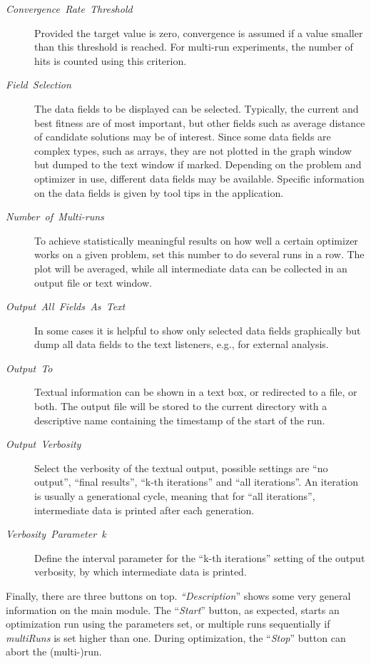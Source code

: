 \begin{description}
\item [{\textit{Convergence~Rate~Threshold}}] Provided the target value
is zero, convergence is assumed if a value smaller than this threshold
is reached. For multi-run experiments, the number of hits is counted
using this criterion.
\item [{\textit{Field~Selection}}] The data fields to be displayed can
be selected. Typically, the current and best fitness are of most important,
but other fields such as average distance of candidate solutions may
be of interest. Since some data fields are complex types, such as
arrays, they are not plotted in the graph window but dumped to the
text window if marked. Depending on the problem and optimizer in use,
different data fields may be available. Specific information on the
data fields is given by tool tips in the application.
\item [{\textit{Number~of~Multi-runs}}] To achieve statistically meaningful
results on how well a certain optimizer works on a given problem,
set this number to do several runs in a row. The plot will be averaged,
while all intermediate data can be collected in an output file or
text window.
\item [{\textit{Output~All~Fields~As~Text}}] In some cases it is helpful
to show only selected data fields graphically but dump all data fields
to the text listeners, e.g., for external analysis.
\item [{\textit{Output~To}}] Textual information can be shown in a text
box, or redirected to a file, or both. The output file will be stored
to the current directory with a descriptive name containing the timestamp
of the start of the run.
\item [{\textit{Output~Verbosity}}] Select the verbosity of the textual
output, possible settings are ``no output'', ``final results'',
``k-th iterations'' and ``all iterations''. An iteration is usually
a generational cycle, meaning that for ``all iterations'', intermediate
data is printed after each generation.
\item [{\textit{Verbosity~Parameter~k}}] Define the interval parameter
for the ``k-th iterations'' setting of the output verbosity, by
which intermediate data is printed.
\end{description}
Finally, there are three buttons on top. \emph{``Description}''
shows some very general information on the main  module.
The ``\emph{Start}'' button, as expected, starts an optimization
run using the parameters set, or multiple runs sequentially if \emph{multiRuns}
is set higher than one. During optimization, the ``\emph{Stop}''
button can abort the (multi-)run.


